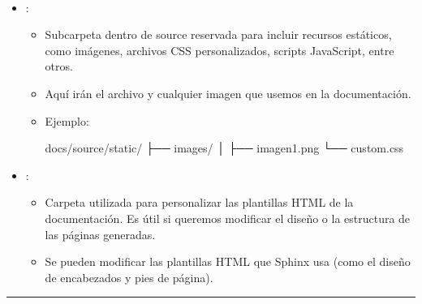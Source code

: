 \documentclass[a4paper,10pt,oneside,spanish,openany]{sphinxmanual}
\begin{document}
\paragraph{}
\label{\detokenize{configuracion_inicial/004.estructura_inicial_proyecto:subcarpetas-importantes}}\begin{itemize}
\item {} 
\sphinxAtStartPar
{}:
\begin{itemize}
\item {} 
\sphinxAtStartPar
Subcarpeta dentro de source reservada para incluir recursos estáticos, como imágenes, archivos CSS personalizados, scripts JavaScript, entre otros.

\item {} 
\sphinxAtStartPar
Aquí irán el archivo  y cualquier imagen que usemos en la documentación.

\item {} 
\sphinxAtStartPar
Ejemplo:

\begin{sphinxVerbatim}[commandchars=\\\{\}]
docs/source/\PYGZus{}static/
├── images/
│   ├── imagen1.png
└── custom.css 
\end{sphinxVerbatim}

\end{itemize}

\item {} 
\sphinxAtStartPar
{}:
\begin{itemize}
\item {} 
\sphinxAtStartPar
Carpeta utilizada para personalizar las plantillas HTML de la documentación. Es útil si queremos modificar el diseño o la estructura de las páginas generadas.

\item {} 
\sphinxAtStartPar
Se pueden modificar las plantillas HTML que Sphinx usa (como el diseño de encabezados y pies de página).

\end{itemize}

\end{itemize}


\bigskip\hrule\bigskip
\end{document}
